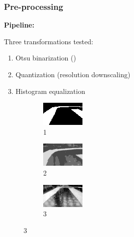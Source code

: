 \documentclass{beamer}
\begin{document}
\begin{frame}
  \frametitle{Pre-processing}

  \textbf{Pipeline:}


  \flushleft Three transformations tested:
  \begin{enumerate}
    \item Otsu binarization (\cite{otsu})
    \item Quantization (resolution downscaling)
    \item Histogram equalization
  \end{enumerate}

  \begin{figure}
    \begin{subfigure}{0.3\linewidth}
      \centering\includegraphics{imgs/binary_up.png}
      \captionsetup{justification=centering}
      \caption*{1}
    \end{subfigure}
    \begin{subfigure}{0.3\linewidth}
      \centering\includegraphics{imgs/trans_up.png}
      \captionsetup{justification=centering}
      \caption*{2}
    \end{subfigure}
    \begin{subfigure}{0.3\linewidth}
      \centering\includegraphics{imgs/eq_up.png}
      \captionsetup{justification=centering}
      \caption*{3}
    \end{subfigure}
  \end{figure}
\end{frame}
\end{document}
